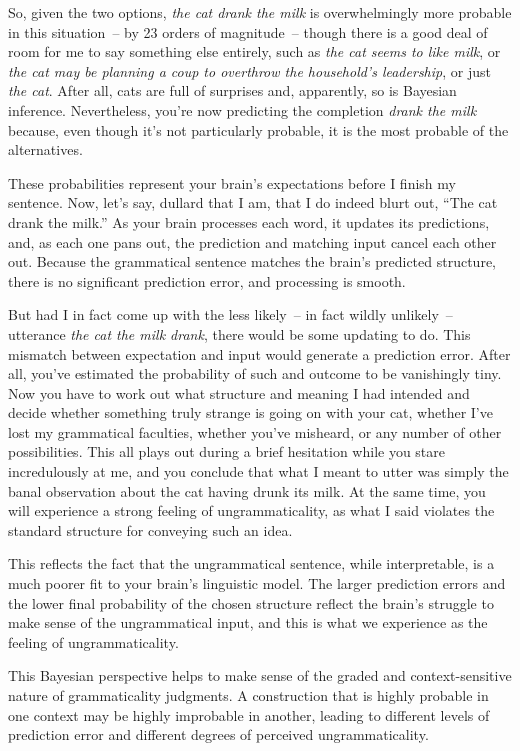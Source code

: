 So, given the two options, \textit{the cat drank the milk} is overwhelmingly more probable in this situation~-- by 23 orders of magnitude~-- though there is a good deal of room for me to say something else entirely, such as \textit{the cat seems to like milk}, or \textit{the cat may be planning a coup to overthrow the household's leadership}, or just \textit{the cat}. After all, cats are full of surprises and, apparently, so is Bayesian inference. Nevertheless, you're now predicting the completion \textit{drank the milk} because, even though it's not particularly probable, it is the most probable of the alternatives.

These probabilities represent your brain's expectations before I finish my sentence. Now, let's say, dullard that I am, that I do indeed blurt out, ``The cat drank the milk.'' As your brain processes each word, it updates its predictions, and, as each one pans out, the prediction and matching input cancel each other out. Because the grammatical sentence matches the brain's predicted structure, there is no significant prediction error, and processing is smooth.

But had I in fact come up with the less likely~-- in fact wildly unlikely~-- utterance \textit{the cat the milk drank}, there would be some updating to do. This mismatch between expectation and input would generate a prediction error. After all, you've estimated the probability of such and outcome to be vanishingly tiny. Now you have to work out what structure and meaning I had intended and decide whether something truly strange is going on with your cat, whether I've lost my grammatical faculties, whether you've misheard, or any number of other possibilities. This all plays out during a brief hesitation while you stare incredulously at me, and you conclude that what I meant to utter was simply the banal observation about the cat having drunk its milk. At the same time, you will experience a strong feeling of ungrammaticality, as what I said violates the standard structure for conveying such an idea.

This reflects the fact that the ungrammatical sentence, while interpretable, is a much poorer fit to your brain's linguistic model. The larger prediction errors and the lower final probability of the chosen structure reflect the brain's struggle to make sense of the ungrammatical input, and this is what we experience as the feeling of ungrammaticality.

\bigskip

This Bayesian perspective helps to make sense of the graded and context-sensitive nature of grammaticality judgments. A construction that is highly probable in one context may be highly improbable in another, leading to different levels of prediction error and different degrees of perceived ungrammaticality.

